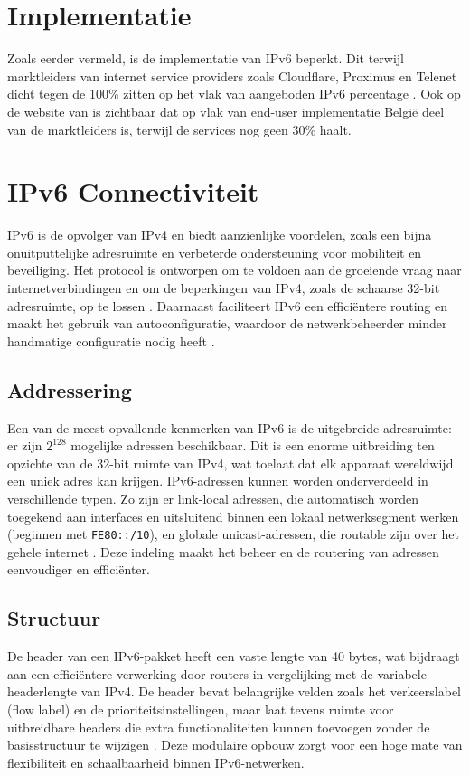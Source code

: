   \section{Implementatie}
  \label{sec:implementatie}
  
  Zoals eerder vermeld, is de implementatie van IPv6 beperkt. 
  Dit terwijl marktleiders van internet service providers zoals Cloudflare, Proximus en Telenet dicht tegen de 100\% zitten op het vlak van aangeboden IPv6 percentage \autocite{Test2024}. 
  Ook op de website van \textcite{EuropeanCommission} is zichtbaar dat op vlak van end-user implementatie België deel van de marktleiders is, terwijl de services nog geen 30\% haalt.
  
  \section{IPv6 Connectiviteit}
  \label{sec:ipv6 connectiviteit}

  IPv6 is de opvolger van IPv4 en biedt aanzienlijke voordelen, zoals een bijna onuitputtelijke adresruimte en verbeterde ondersteuning voor mobiliteit en beveiliging. 
  Het protocol is ontworpen om te voldoen aan de groeiende vraag naar internetverbindingen en om de beperkingen van IPv4, zoals de schaarse 32-bit adresruimte, op te lossen \textcite{NSA2023}. 
  Daarnaast faciliteert IPv6 een efficiëntere routing en maakt het gebruik van autoconfiguratie, waardoor de netwerkbeheerder minder handmatige configuratie nodig heeft \textcite{Cliff2012}.
  
  \subsection{Addressering}
  Een van de meest opvallende kenmerken van IPv6 is de uitgebreide adresruimte: er zijn $2^{128}$ mogelijke adressen beschikbaar. 
  Dit is een enorme uitbreiding ten opzichte van de 32-bit ruimte van IPv4, wat toelaat dat elk apparaat wereldwijd een uniek adres kan krijgen. 
  IPv6-adressen kunnen worden onderverdeeld in verschillende typen. Zo zijn er link-local adressen, 
  die automatisch worden toegekend aan interfaces en uitsluitend binnen een lokaal netwerksegment werken (beginnen met \texttt{FE80::/10}), en globale unicast-adressen, 
  die routable zijn over het gehele internet \textcite{Zunainah2021}. Deze indeling maakt het beheer en de routering van adressen eenvoudiger en efficiënter.
  
  \subsection{Structuur}
  De header van een IPv6-pakket heeft een vaste lengte van 40 bytes, wat bijdraagt aan een efficiëntere verwerking door routers in vergelijking met de variabele headerlengte van IPv4. 
  De header bevat belangrijke velden zoals het verkeerslabel (flow label) en de prioriteitsinstellingen, 
  maar laat tevens ruimte voor uitbreidbare headers die extra functionaliteiten kunnen toevoegen zonder de basisstructuur te wijzigen \textcite{Cliff2012}. 
  Deze modulaire opbouw zorgt voor een hoge mate van flexibiliteit en schaalbaarheid binnen IPv6-netwerken.
  
